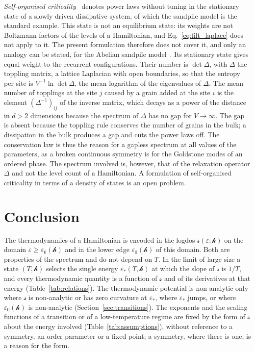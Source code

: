 \documentclass[10pt,a4paper]{article}
\theoremstyle{plain}
\newcommand{\lndos}{{logdos}}  %
\newcommand{\hfield}{\mathscr{h}}  %
\newcommand{\lds}{\mathscr{s}}  %
\begin{document}
\emph{Self-organised criticality}~\cite{BTW1987} denotes power laws without
tuning in the stationary state of a slowly driven dissipative system, of
which the sandpile model is the standard example. This state is not an
equilibrium state: its weights are not Boltzmann factors of the levels of a
Hamiltonian, and Eq.~\eqref{eq:filt_laplace} does not apply to it. The
present formulation therefore does not cover it, and only an analogy can be
stated, for the Abelian sandpile model~\cite{Dhar1990}. Its stationary state
gives equal weight to the recurrent configurations. Their number is
$\det\Delta$, with $\Delta$ the toppling matrix, a lattice Laplacian with
open boundaries, so that the entropy per site is $V^{-1}\ln\det\Delta$, the
mean logarithm of the eigenvalues of $\Delta$. The mean number of topplings
at the site $j$ caused by a grain added at the site $i$ is the element
$(\Delta^{-1})_{ij}$ of the inverse matrix, which decays as a power of the
distance in $d>2$ dimensions because the spectrum of $\Delta$ has no gap for
$V\to\infty$. The gap is absent because the toppling rule conserves the
number of grains in the bulk; a dissipation in the bulk produces a gap and
cuts the power laws off. The conservation law is thus the reason for a
gapless spectrum at all values of the parameters, as a broken continuous
symmetry is for the Goldstone modes of an ordered phase. The spectrum
involved is, however, that of the relaxation operator $\Delta$ and not the
level count of a Hamiltonian. A formulation of self-organised criticality
in terms of a density of states is an open problem.

\section{Conclusion}
\label{sec:principle}\label{sec:summary}

The thermodynamics of a Hamiltonian is encoded in the \lndos{}
$\lds(\varepsilon;\hfield)$ on the domain $\varepsilon\ge\varepsilon_0(\hfield)$
and in the lower edge $\varepsilon_0(\hfield)$ of this domain. Both are
properties of the spectrum and do not depend on $T$. In the limit of large
size a state $(T,\hfield)$ selects the single energy $\varepsilon_*(T,\hfield)$
at which the slope of $\lds$ is $1/T$, and every thermodynamic quantity is a
function of $\lds$ and of its derivatives at that energy
(Table~\ref{tab:relations}). The thermodynamic potential is non-analytic
only where $\lds$ is non-analytic or has zero curvature at $\varepsilon_*$,
where $\varepsilon_*$ jumps, or where $\varepsilon_0(\hfield)$ is non-analytic
(Section~\ref{sec:transitions}). The exponents and the scaling functions of
a transition or of a low-temperature regime are fixed by the form of $\lds$
about the energy involved (Table~\ref{tab:assumptions}), without reference
to a symmetry, an order parameter or a fixed point; a symmetry, where there
is one, is a reason for the form.
\end{document}
